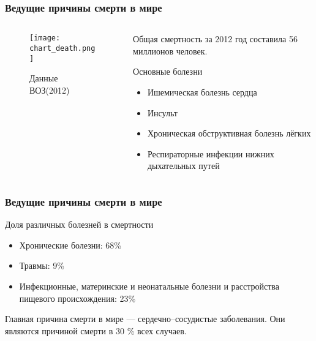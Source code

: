\documentclass[10pt]{beamer}
\begin{document}
	\begin{frame}
		\frametitle{Ведущие причины смерти в мире}
		\begin{columns}
			\begin{column}{0.5\textwidth}
				\begin{figure}
					\caption{Данные ВОЗ(2012)}
					\texttt{[image: chart\_death.png]}
				\end{figure}
			\end{column}
			\begin{column}{0.5\textwidth}

				Общая смертность за 2012 год составила \alert{56 миллионов} человек.

				\begin{block}{Основные болезни}
					\begin{itemize}
						\item Ишемическая болезнь сердца
						\item Инсульт
						\item Хроническая обструктивная болезнь лёгких
						\item Респираторные инфекции нижних дыхательных путей
					\end{itemize}
				\end{block}
			\end{column}
		\end{columns}
	\end{frame}
	\begin{frame}
		\frametitle{Ведущие причины смерти в мире}
				\begin{block}{Доля различных болезней в смертности}
					\begin{itemize}
						\item Хронические болезни: 68\% 
						\item Травмы: 9\%
						\item Инфекционные, материнские и неонатальные болезни и
						расстройства пищевого происхождения: 23\%
					\end{itemize}
				\end{block}
				Главная причина смерти в мире --- сердечно--сосудистые заболевания. 
				Они являются причиной смерти в 30 \% всех случаев. 
	\end{frame}
\end{document}
